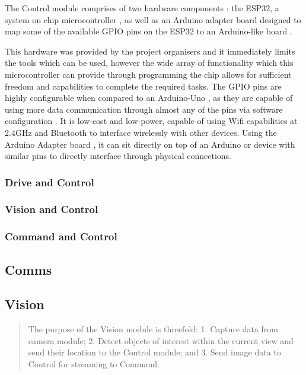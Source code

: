 \documentclass[a4paper]{article}
\begin{document}
The Control module comprises of two hardware components \cite{BoxContent}: 
the ESP32, a system on chip microcontroller \cite{ESP32Datasheet}, as well as an Arduino adapter
board designed to map some of the available GPIO pins on the ESP32 to an Arduino-like
board \cite{ESP32ArduinoAdapter}.

This hardware was provided by the project organisers and it immediately limits
the tools which can be used, however the wide array of functionality which
this microcontroller can provide through programming the chip allows
for sufficient freedom and capabilities to complete the required tasks. The
GPIO pins are highly configurable when compared to an Arduino-Uno \cite{MicrocontrollerComparison}, as they
are capable of using more data communication through almost any of the pins
via software configuration \cite{ESP32PinOut}. It is low-cost and low-power, 
capable of using Wifi capabilities at 2.4GHz and Bluetooth \cite{ESP32Datasheet} to interface wirelessly
with other devices. Using the Arduino Adapter board \cite{ESP32ArduinoAdapter}, it can sit directly on top of
an Arduino or device with similar pins to directly interface through physical connections. 


\subsubsection{Drive and Control}

\subsubsection{Vision and Control}

\subsubsection{Command and Control}

\subsection{Comms}

\subsection{Vision}
\begin{abstract}
    The purpose of the Vision module is threefold:
    1. Capture data from camera module;
    2. Detect objects of interest within the current view and 
        send their location to the Control module; and
    3. Send image data to Control for streaming to Command. 
\end{abstract}
\end{document}
